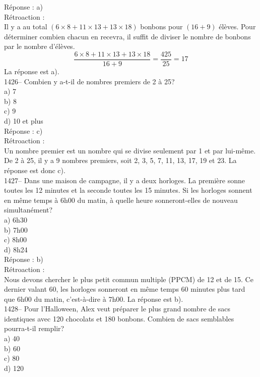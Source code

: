 R\'eponse : a)\\

R\'etroaction :\\
Il y a au total $(6\times8+11\times13+13\times18)$ bonbons pour
$(16+9)$ \'el\`eves. Pour d\'eterminer combien chacun en recevra, il
suffit de diviser le nombre de bonbons par le nombre d'\'el\`eves.
$$\frac{6\times8+11\times13+13\times18}{16+9}=\frac{425}{25}=17$$
La r\'eponse est a).\\

1426-- Combien y a-t-il de nombres premiers de 2 \`a 25?\\
a) 7\\
b) 8\\
c) 9\\
d) 10 et plus\\

R\'eponse : c)\\

R\'etroaction :\\
Un nombre premier est un nombre qui se divise seulement par 1 et par
lui-m\^eme. De 2 \`a 25, il y a 9 nombres premiers, soit 2, 3, 5, 7,
11, 13, 17, 19 et 23. La r\'eponse est donc c).\\

1427-- Dans une maison de campagne, il y a deux horloges. La
premi\`ere sonne toutes les 12 minutes et la seconde toutes les 15
minutes. Si les horloges sonnent en m\^eme temps \`a 6h00 du matin,
\`a quelle heure sonneront-elles de nouveau simultan\'ement?\\
a) 6h30\\
b) 7h00\\
c) 8h00\\
d) 8h24\\

R\'eponse : b)\\

R\'etroaction :\\
Nous devons chercher le plus petit commun multiple (PPCM) de 12 et
de 15. Ce dernier valant 60, les horloges sonneront en m\^eme
temps 60 minutes plus tard que 6h00 du matin, c'est-\`a-dire \`a 7h00. La
r\'eponse est b).\\

1428-- Pour l'Halloween, Alex veut pr\'eparer le plus grand nombre de
sacs identiques avec 120 chocolats et 180 bonbons. Combien de sacs
semblables pourra-t-il
remplir?\\
a) 40\\
b) 60\\
c) 80\\
d) 120\\

